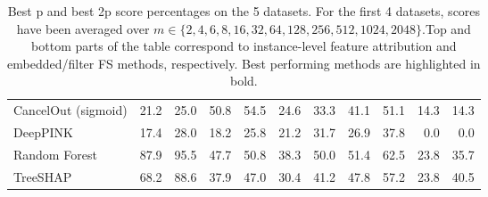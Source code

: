 \begin{table}[h!]
{{\begin{tabular}{lrrrrrrrrrr}
CancelOut (sigmoid) & 21.2 & 25.0 & 50.8 & 54.5 & 24.6 & 33.3 & 41.1 & 51.1 & 14.3 & 14.3 \\
DeepPINK & 17.4 & 28.0 & 18.2 & 25.8 & 21.2 & 31.7 & 26.9 & 37.8 & 0.0 & 0.0 \\
Random Forest & 87.9 & 95.5 & 47.7 & 50.8 & 38.3 & 50.0 & 51.4 & 62.5 & 23.8 & 35.7 \\
TreeSHAP & 68.2 & 88.6 & 37.9 & 47.0 & 30.4 & 41.2 & 47.8 & 57.2 & 23.8 & 40.5 \\
\bottomrule
\end{tabular}}}{}
\caption{Best p and best 2p score percentages on the 5 datasets. For the first 4 datasets, scores have been averaged over $m \in \{2, 4, 6, 8, 16, 32, 64, 128, 256, 512, 1024, 2048\}$.Top and bottom parts of the table correspond to instance-level feature attribution and embedded/filter FS methods, respectively. Best performing methods are highlighted in bold.}
\end{table}
